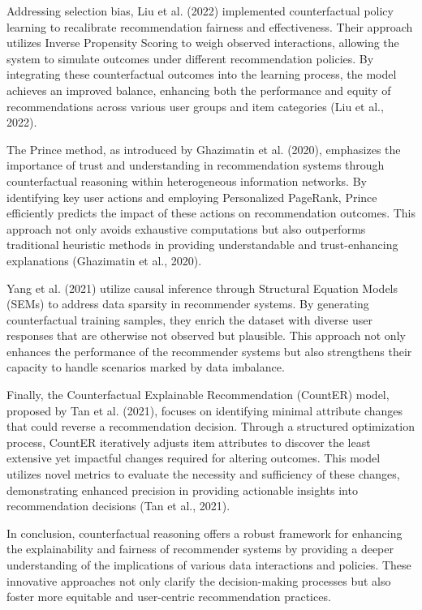 Addressing selection bias, Liu et al. (2022) implemented counterfactual policy learning to recalibrate recommendation fairness and effectiveness. Their approach utilizes Inverse Propensity Scoring to weigh observed interactions, allowing the system to simulate outcomes under different recommendation policies. By integrating these counterfactual outcomes into the learning process, the model achieves an improved balance, enhancing both the performance and equity of recommendations across various user groups and item categories (Liu et al., 2022).

The Prince method, as introduced by Ghazimatin et al. (2020), emphasizes the importance of trust and understanding in recommendation systems through counterfactual reasoning within heterogeneous information networks. By identifying key user actions and employing Personalized PageRank, Prince efficiently predicts the impact of these actions on recommendation outcomes. This approach not only avoids exhaustive computations but also outperforms traditional heuristic methods in providing understandable and trust-enhancing explanations (Ghazimatin et al., 2020).

Yang et al. (2021) utilize causal inference through Structural Equation Models (SEMs) to address data sparsity in recommender systems. By generating counterfactual training samples, they enrich the dataset with diverse user responses that are otherwise not observed but plausible. This approach not only enhances the performance of the recommender systems but also strengthens their capacity to handle scenarios marked by data imbalance.

Finally, the Counterfactual Explainable Recommendation (CountER) model, proposed by Tan et al. (2021), focuses on identifying minimal attribute changes that could reverse a recommendation decision. Through a structured optimization process, CountER iteratively adjusts item attributes to discover the least extensive yet impactful changes required for altering outcomes. This model utilizes novel metrics to evaluate the necessity and sufficiency of these changes, demonstrating enhanced precision in providing actionable insights into recommendation decisions (Tan et al., 2021).

In conclusion, counterfactual reasoning offers a robust framework for enhancing the explainability and fairness of recommender systems by providing a deeper understanding of the implications of various data interactions and policies. These innovative approaches not only clarify the decision-making processes but also foster more equitable and user-centric recommendation practices.


